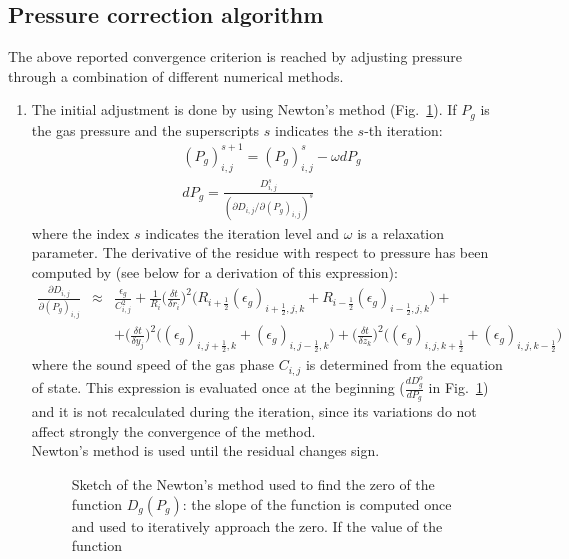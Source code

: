 \subsection{\label{sect:pressure}Pressure correction algorithm}
%
The above reported convergence criterion is reached by adjusting 
pressure through a combination of different numerical methods.
\begin{enumerate}
\item
The initial adjustment is done by using Newton's method (Fig.~\ref{fig:newtonm}). 
If $P_g$ is the gas pressure and the superscripts $s$ indicates the $s$-th iteration:
%
\begin{eqnarray}
(P_g)_{i,j}^{s+1} =  (P_g)_{i,j}^{s} - \omega dP_g  \label{eq:correction}\\
dP_g = \frac {D_{i,j}^s} {\left(\partial D_{i,j} / \partial (P_g)_{i,j}\right)^s}\label{eq:dDdP}
\end{eqnarray}
%
where the index $s$ indicates the iteration level and $\omega$ is a relaxation parameter.
The derivative of the residue with respect to pressure has been computed by (see below for
a derivation of this expression):
%
\begin{eqnarray}
\frac{\partial D_{i,j}} {\partial (P_g)_{i,j}} & \approx & 
\frac{\epsilon_g}{C_{i,j}^{2}} +
\frac{1}{R_i}\Big(\frac {\delta t} {\delta r_i}\Big)^2 \big( 
R_{i+\frac{1}{2}} (\epsilon_g)_{i+\frac{1}{2},j,k} +
R_{i-\frac{1}{2}} (\epsilon_g)_{i-\frac{1}{2},j,k} \big)+\\
&&+\Big(\frac {\delta t} {\delta y_j}\Big)^2 \big( 
(\epsilon_g)_{i,j+\frac{1}{2},k} + (\epsilon_g)_{i,j-\frac{1}{2},k} \big)+
\Big(\frac {\delta t} {\delta z_k}\Big)^2 \big( 
(\epsilon_g)_{i,j,k+\frac{1}{2}} + (\epsilon_g)_{i,j,k-\frac{1}{2}} \big)
\nonumber
\end{eqnarray}
%
where the sound speed of the gas phase $C_{i,j}$ is determined from the equation of state. This expression
is evaluated once at the beginning ($\frac{dD_g^o}{dP_g}$ in Fig.~\ref{fig:newtonm}) 
and it is not recalculated during the iteration, since its variations do not affect strongly 
the convergence of the method.\\
Newton's method is used until the residual changes sign.
\begin{figure}[h]
\centerline{}
\caption{\label{fig:newtonm} Sketch of the Newton's method used to find the 
zero of the function $D_g(P_g)$: the slope of the function is computed once 
and used to iteratively approach the zero.  If the value of the function 
}
\end{figure}
\end{enumerate}
